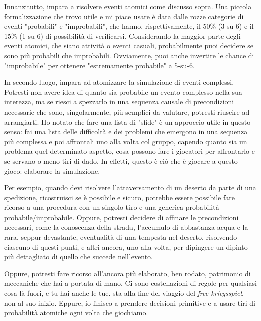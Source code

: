 Innanzitutto, impara a risolvere eventi atomici come discusso sopra. Una piccola formalizzazione che trovo utile e mi piace usare è data dalle rozze categorie di eventi "probabili" e "improbabili", che hanno, rispettivamente, il 50\% (3-su-6) e il 15\% (1-su-6) di possibilità di verificarsi. Considerando la maggior parte degli eventi atomici, che siano attività o eventi casuali, probabilmente puoi decidere se sono più probabili che improbabili. Ovviamente, puoi anche invertire le chance di "improbabile" per ottenere "estremamente probabile" a 5-su-6.

In secondo luogo, impara ad atomizzare la simulazione di eventi complessi. Potresti non avere idea di quanto sia probabile un evento complesso nella sua interezza, ma se riesci a spezzarlo in una sequenza causale di precondizioni necessarie che sono, singolarmente, più semplici da valutare, potresti riuscire ad arrangiarti. Ho notato che fare una lista di "sfide" è un approccio utile in questo senso: fai una lista delle difficoltà e dei problemi che emergono in una sequenza più complessa e poi affrontali uno alla volta col gruppo, capendo quanto sia un problema quel determinato aspetto, cosa possono fare i giocatori per affrontarlo e se servano o meno tiri di dado. In effetti, questo è ciò che è giocare a questo gioco: elaborare la simulazione.

Per esempio, quando devi risolvere l'attaversamento di un deserto da parte di una spedizione, ricostruisci se è possibile e sicuro, potrebbe essere possibile fare ricorso a una procedura con un singolo tiro e una generica probabilità probabile/improbabile. Oppure, potresti decidere di affinare le precondizioni necessari, come la conoscenza della strada, l'accumulo di abbastanza acqua e la rara, seppur devastante, eventualità di una tempesta nel deserto, risolvendo ciascuno di questi punti, e altri ancora, uno alla volta, per dipingere un dipinto più dettagliato di quello che succede nell'evento.

Oppure, potresti fare ricorso all'ancora più elaborato, ben rodato, patrimonio di meccaniche che hai a portata di mano. Ci sono costellazioni di regole per qualsiasi cosa là fuori, e tu hai anche le tue. \dnd{} sta alla fine del viaggio del \textit{free kriegsspiel}, non al suo inizio. Eppure, io finisco a prendere decisioni primitive e a usare tiri di probabilità atomiche ogni volta che giochiamo.